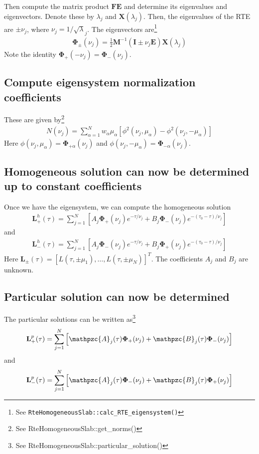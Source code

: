 \documentclass[11pt]{article}
\newcommand{\mvec}[1]{\mathbf{#1}}
\newcommand{\gvec}[1]{\boldsymbol{#1}}
\newcommand{\script}[1]{\mathpzc{#1}}
\begin{document}
Then compute the matrix product $\mvec{F}\mvec{E}$ and determine its
eigenvalues and eigenvectors. Denote these by $\lambda_j$ and
$\mvec{X}(\lambda_j)$.  Then, the eigenvalues of the RTE are $\pm
\nu_j$, where $\nu_j = 1/\sqrt\lambda_j$. The eigenvectors
are\footnote{See {\tt RteHomogeneousSlab::calc\_RTE\_eigensystem()}}
\begin{align}
  \gvec{\Phi}_\pm (\nu_j)
  = \frac{1}{2}\mvec{M}^{-1}
  (\mvec{I} \pm \nu_j\mvec{E})\mvec{X}(\lambda_j)
\end{align}
Note the identity $\gvec{\Phi}_+(-\nu_j) =
\gvec{\Phi}_-(\nu_j)$.




\subsection{Compute eigensystem normalization coefficients}
These are given by\footnote{See RteHomogeneousSlab::get\_norms()}
\begin{align}
  N(\nu_j) = \sum_{\alpha=1}^N
  w_\alpha \mu_\alpha
  \left[
    \phi^2(\nu_j,\mu_\alpha) - \phi^2(\nu_j,-\mu_\alpha)
  \right]
\end{align}
Here $\phi(\nu_j,\mu_\alpha) = \gvec{\Phi}_{+\alpha}(\nu_j)$ and
$\phi(\nu_j,-\mu_\alpha) = \gvec{\Phi}_{-\alpha}(\nu_j)$.





\subsection{Homogeneous solution can now be determined up to constant
  coefficients}
Once we have the eigensystem, we can compute the homogeneous solution
\begin{align}
  \mvec{L}^h_+(\tau) = \sum_{j=1}^N
  \left[
    A_j \gvec{\Phi}_+(\nu_j) e^{-\tau/\nu_j} +
    B_j \gvec{\Phi}_-(\nu_j) e^{-(\tau_0-\tau)/\nu_j}
  \right]
\end{align}
and
\begin{align}
  \mvec{L}^h_-(\tau) = \sum_{j=1}^N
  \left[
    A_j \gvec{\Phi}_-(\nu_j) e^{-\tau/\nu_j} +
    B_j \gvec{\Phi}_+(\nu_j) e^{-(\tau_0-\tau)/\nu_j}
  \right]
\end{align}
Here $\mvec{L}_\pm(\tau) = [L(\tau,\pm\mu_1),\ldots,
L(\tau,\pm\mu_N)]^T$. The coefficients $A_j$ and $B_j$ are unknown.




\subsection{Particular solution can now be determined}
The particular solutions can be written as\footnote{See
  RteHomogeneousSlab::particular\_solution()}
\begin{align}
  \mvec{L}^p_+(\tau) = \sum_{j=1}^N
  \left[
    \script{A}_j(\tau) \gvec{\Phi}_+(\nu_j) +
    \script{B}_j(\tau) \gvec{\Phi}_-(\nu_j)
  \right]
\end{align}
and
\begin{align}
  \mvec{L}^p_-(\tau) = \sum_{j=1}^N
  \left[
    \script{A}_j(\tau) \gvec{\Phi}_-(\nu_j) +
    \script{B}_j(\tau) \gvec{\Phi}_+(\nu_j)
  \right]
\end{align}
\end{document}
